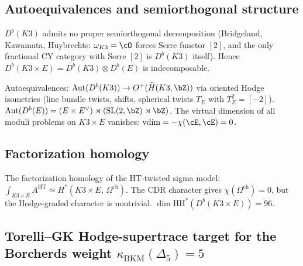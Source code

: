 \subsection{Autoequivalences and semiorthogonal structure}
\label{subsec:sod-k3xe}

\begin{proposition}
\label{prop:sod-k3xe}
$D^b(K3)$ admits no proper semiorthogonal decomposition
\textup{(}Bridgeland, Kawamata, Huybrechts: $\omega_{K3} = \cO$
forces Serre functor $[2]$, and the only fractional CY category
with Serre $[2]$ is $D^b(K3)$ itself\textup{)}. Hence
$D^b(K3 \times E) = D^b(K3) \otimes D^b(E)$ is indecomposable.

Autoequivalences: $\mathrm{Aut}(D^b(K3)) \to
O^+(\widetilde{H}(K3,\bZ))$ via oriented Hodge isometries
(line bundle twists, shifts, spherical twists $T_E$ with
$T_E^2 = [-2]$). $\mathrm{Aut}(D^b(E)) =
(E \times E^\vee) \rtimes (\mathrm{SL}(2,\bZ) \rtimes \bZ)$.
The virtual dimension of all moduli problems on $K3 \times E$
vanishes: $\mathrm{vdim} = -\chi(\cE,\cE) = 0$.
\end{proposition}

\subsection{Factorization homology}
\label{subsec:fact-homology-k3xe}

\begin{remark}
\label{rem:fact-homology-k3xe}
The factorization homology of the HT-twisted sigma model:
$\int_{K3 \times E} A^{\mathrm{HT}} \simeq
H^*(K3 \times E,\, \Omega^{\mathrm{ch}})$.
The CDR character gives $\chi(\Omega^{\mathrm{ch}}) = 0$, but the
Hodge-graded character is nontrivial.
$\dim \mathrm{HH}^*(D^b(K3 \times E)) = 96$.
\end{remark}

\subsection{Torelli--GK Hodge-supertrace target for the Borcherds weight \texorpdfstring{$\kappa_{\mathrm{BKM}}(\Delta_5) = 5$}{kappa-BKM = 5}}
\label{subsec:bl-hodge-supertrace-derivation-k3e}


